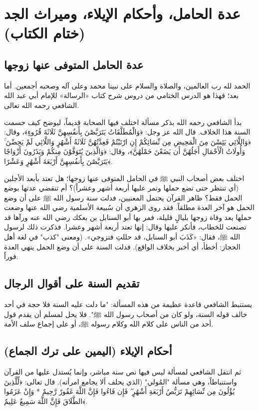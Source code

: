 \chapter{عدة الحامل، وأحكام الإيلاء، وميراث الجد (ختام الكتاب)}

\section{عدة الحامل المتوفى عنها زوجها}
الحمد لله رب العالمين، والصلاة والسلام على نبينا محمد وعلى آله وصحبه أجمعين. أما بعد؛ فهذا هو الدرس الختامي من دروس شرح كتاب «الرسالة» للإمام أبي عبد الله الشافعي رحمه الله تعالى.

بدأ الشافعي رحمه الله بذكر مسألة اختلف فيها الصحابة قديماً، ليوضح كيف حسمت السنة هذا الخلاف. قال الله عز وجل: ﴿وَالْمُطَلَّقَاتُ يَتَرَبَّصْنَ بِأَنفُسِهِنَّ ثَلَاثَةَ قُرُوءٍ﴾، وقال: ﴿وَاللَّائِي يَئِسْنَ مِنَ الْمَحِيضِ مِن نِّسَائِكُمْ إِنِ ارْتَبْتُمْ فَعِدَّتُهُنَّ ثَلَاثَةُ أَشْهُرٍ وَاللَّائِي لَمْ يَحِضْنَ ۚ وَأُولَاتُ الْأَحْمَالِ أَجَلُهُنَّ أَن يَضَعْنَ حَمْلَهُنَّ﴾، وقال: ﴿وَالَّذِينَ يُتَوَفَّوْنَ مِنكُمْ وَيَذَرُونَ أَزْوَاجًا يَتَرَبَّصْنَ بِأَنفُسِهِنَّ أَرْبَعَةَ أَشْهُرٍ وَعَشْرًا﴾.

اختلف بعض أصحاب النبي ﷺ في الحامل المتوفى عنها زوجها؛ هل تعتد بأبعد الأجلين (أي تنتظر حتى تضع حملها وتمر عليها أربعة أشهر وعشراً)؟ أم تنقضي عدتها بوضع الحمل فقط؟ 
ظاهر القرآن يحتمل المعنيين، فدلت سنة رسول الله ﷺ على أن وضع الحمل هو آخر العدة مطلقاً. فقد روى الزهري أن سُبيعة الأسلمية رضي الله عنها وضعت حملها بعد وفاة زوجها بليالٍ قليلة، فمر بها أبو السنابل بن بعكك رضي الله عنه ورآها قد تصنعت للخطاب، فأنكر عليها وقال: إنها تعتد أربعة أشهر وعشرا. فذكرت ذلك لرسول الله ﷺ، فقال: «كَذَبَ أبو السنابل، قد حللتِ فتزوجي». 
(ومعنى "كذب" في لغة أهل الحجاز: أخطأ، أي أخبر بخلاف الواقع). فدلت السنة على أن وضع الحمل ينهي العدة فوراً.

\section{تقديم السنة على أقوال الرجال}
يستنبط الشافعي قاعدة عظيمة من هذه المسألة: "ما دلت عليه السنة فلا حجة في أحد خالف قوله السنة، ولو كان من أصحاب رسول الله ﷺ". فلا يحل لمسلم أن يقدم قول أحد من الناس على كلام الله وكلام رسوله ﷺ، أو على إجماع سلف الأمة. 

\section{أحكام الإيلاء (اليمين على ترك الجماع)}
ثم انتقل الشافعي لمسألة ليس فيها نص سنة مباشر، وإنما يُستدل عليها من القرآن واستنباطاً، وهي مسألة "المُولي" (الذي يحلف ألا يجامع امرأته).
قال تعالى: ﴿لِّلَّذِينَ يُؤْلُونَ مِن نِّسَائِهِمْ تَرَبُّصُ أَرْبَعَةِ أَشْهُرٍ ۖ فَإِن فَاءُوا فَإِنَّ اللَّهَ غَفُورٌ رَّحِيمٌ * وَإِنْ عَزَمُوا الطَّلَاقَ فَإِنَّ اللَّهَ سَمِيعٌ عَلِيمٌ﴾.

